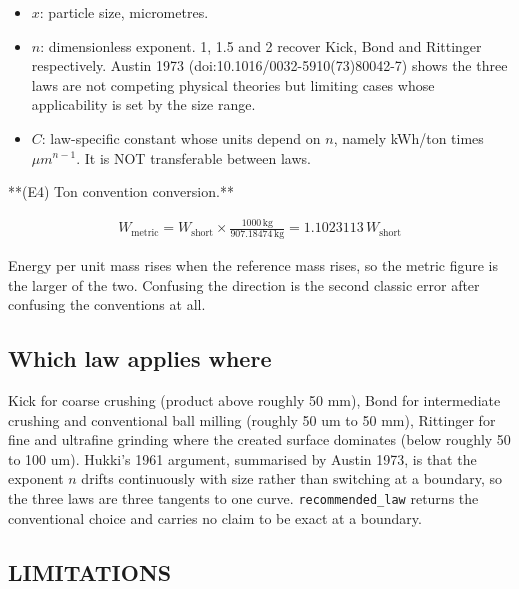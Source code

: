 \documentclass[10pt,a4paper,twoside]{report}
\begin{document}
\begin{itemize}
\item $x$: particle size, micrometres.
\item $n$: dimensionless exponent. 1, 1.5 and 2 recover Kick, Bond and Rittinger respectively. Austin 1973 (doi:10.1016/0032-5910(73)80042-7) shows the three laws are not competing physical theories but limiting cases whose applicability is set by the size range.
\item $C$: law-specific constant whose units depend on $n$, namely kWh/ton times $\mu m^{n-1}$. It is NOT transferable between laws.
\end{itemize}

**(E4) Ton convention conversion.**

\begin{equation*}
\begin{gathered}
W_{\text{metric}} = W_{\text{short}} \times \frac{1000\,\mathrm{kg}}{907.18474\,\mathrm{kg}} = 1.1023113\, W_{\text{short}}
\end{gathered}
\end{equation*}

Energy per unit mass rises when the reference mass rises, so the metric figure is the larger of the two. Confusing the direction is the second classic error after confusing the conventions at all.

\subsection*{Which law applies where}

Kick for coarse crushing (product above roughly 50 mm), Bond for intermediate crushing and conventional ball milling (roughly 50 um to 50 mm), Rittinger for fine and ultrafine grinding where the created surface dominates (below roughly 50 to 100 um). Hukki's 1961 argument, summarised by Austin 1973, is that the exponent $n$ drifts continuously with size rather than switching at a boundary, so the three laws are three tangents to one curve. \texttt{recommended\_law} returns the conventional choice and carries no claim to be exact at a boundary.

\subsection*{LIMITATIONS}
\end{document}
